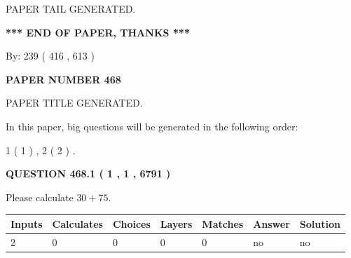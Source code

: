 \documentclass[12pt]{article}
\begin{document}
   
   
   
   
   
 \vspace{0.2in}
 
   
   
\vspace{2.0in} PAPER TAIL GENERATED.
   
   
   
   
\vspace{1.0in} 
{\textbf{\large{ *** END OF PAPER, THANKS *** }}} 
   
   
\hspace{1.0in} By: 
 239 ( 416 ,  613 )
   
   
   
   
\newpage 
\setcounter{page}{ 
   468001 } 
   
   
   
   
 {\textbf{ \Large{ PAPER NUMBER  468  }}}
   
   
\vspace{0.2in}
   
   
   
   
   
   
   
   
 \vspace{0.2in}
 
 
 
 
   
   
 PAPER TITLE GENERATED.
   
   
   
\vspace{0.2in}
   
In this paper, big questions will be generated in the following order: 
   
   
   1 ( 1 )
 ,
   2 ( 2 )
 .
  
\vspace{0.2in}
  
{\textbf{\Large{QUESTION
468.1 
 ( 1 , 1 , 6791 )
}}}
  
  
 
Please calculate $ %
30 +  %
75 $.
 
 
   
   
   
   
\noindent\begin{tabular}{|l|l|l|l|l|l|l|}
 \hline
Inputs & Calculates & Choices & Layers & Matches & Answer & Solution \\ \hline
 2  & 
 0  & 
 0
  & 
 0  & 
 0  & 
  no & 
  no 
  \\ \hline
 \end{tabular}
   
\end{document}
